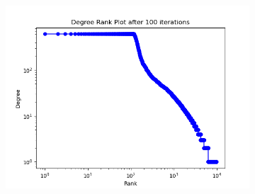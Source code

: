 \documentclass[12pt]{article}
\numberwithin{equation}{section}
\begin{document}
\begin{figure}[!ht]
\begin{subfigure}[b]{0.32\textwidth}
    \includegraphics[width=\textwidth]{Prob S movie rank plot - 100 iterations.png}
\end{subfigure}

\vspace{1em} %


\end{figure}
\end{document}
